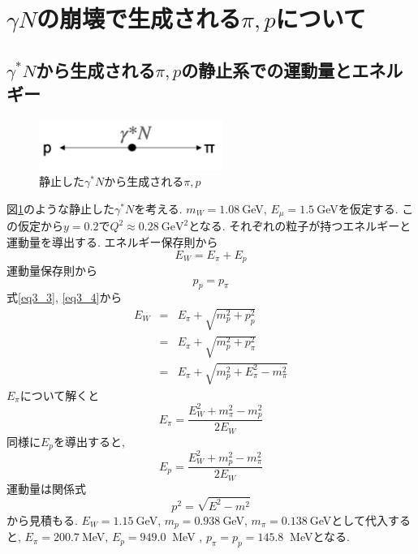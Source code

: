 \section{\texorpdfstring{$\gamma N$の崩壊で生成される$\pi, p$について}{LG}}
\subsection{$\gamma^* N$から生成される$\pi,p$の静止系での運動量とエネルギー}
\begin{figure}[H]
    \centering
    \includegraphics[width=6cm]{img/rest_middle_situation.png}
    \caption{静止した$\gamma^* N$から生成される$\pi,p$}
    \label{fig:angle5}
\end{figure}
図\ref{fig:angle5}のような静止した$\gamma^* N$を考える.
$m_W = 1.08 \ $GeV, $E_\mu = 1.5 \ $GeVを仮定する.
この仮定から$y = 0.2$で$Q^2 \approx 0.28 \ \mathrm{GeV^2}$となる.
それぞれの粒子が持つエネルギーと運動量を導出する.
エネルギー保存則から
\begin{equation}
    \label{eq3_3}
    E_W = E_\pi + E_p
\end{equation}
運動量保存則から
\begin{equation}
    \label{eq3_4}
    p_p = p_\pi
\end{equation}
式\ref{eq3_3}, \ref{eq3_4}から
\begin{eqnarray}
    E_W  & =  & E_\pi + \sqrt{m_p^2 + p_p^2} \\
    & = & E_\pi + \sqrt{m_p^2 + p_\pi^2} \\
    & = & E_\pi + \sqrt{m_p^2 + E_\pi^2 - m_\pi^2}
\end{eqnarray}
$E_\pi$について解くと
\begin{equation}
    E_\pi = \dfrac{E_W ^2 + m_\pi ^2 - m_p ^2}{2E_W}
\end{equation}
同様に$E_p$を導出すると, 
\begin{equation}
    E_p = \dfrac{E_W ^2 + m_p ^2 - m_\pi ^2}{2E_W}
\end{equation}
運動量は関係式
\begin{equation}
    p^2 = \sqrt{E^2 - m^2}
\end{equation}
から見積もる.
$E_W = 1.15 \ $GeV, $m_p = 0.938 \ $GeV, $m_\pi = 0.138 \ $GeVとして代入すると, 
$E_π = 200.7 \ $MeV, $E_p = 949.0 \ $ MeV , $p_π = p_p = 145.8 \ $ MeVとなる.

